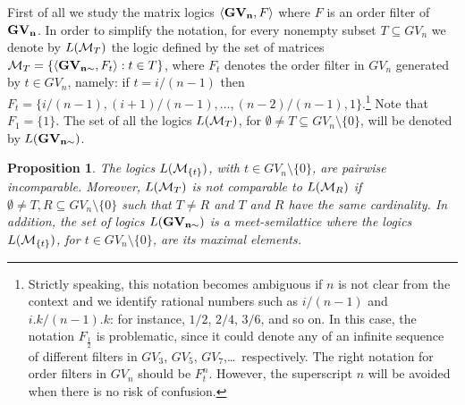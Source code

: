 \documentclass{article}
\newtheorem{proposition}{Proposition}
\theoremstyle{definition}
\begin{document}
First of all we study the matrix logics $\langle {\bf GV_n},F\rangle$ where $F$ is an order filter of $\bf GV_n$. 
In order to simplify the notation, for every nonempty subset $T \subseteq GV_n$ we denote by $L({\cal M}_T )$ the logic defined by the set of matrices ${\cal M}_T = \{\langle {\bf GV_{n\sim}},F_t \rangle : t \in T\}$, where $F_t$ denotes the order filter in $GV_n$ generated by $t \in GV_n$, namely: if $t=i/(n-1)$ then $F_t = \{i/(n-1), (i+1)/(n-1), \ldots, (n-2)/(n-1), 1\}$.\footnote{Strictly speaking, this notation becomes ambiguous if $n$ is not clear from the context and we  identify rational numbers such as $i/(n-1)$ and $i.k/(n-1).k$:  for instance, $1/2$, $2/4$, $3/6$, and so on. In this case, the notation $F_{\frac{1}{2}}$ is problematic, since it  could denote any of an infinite sequence of different filters in  $GV_3$, $GV_5$, $GV_7$,\ldots\ respectively. The right notation for order filters in $GV_n$ should be $F^n_t$. However, the superscript $n$ will be avoided when there is no risk of confusion.} Note that $F_1=\{1\}$. The set of all the logics $L({\cal M}_T )$, for $\emptyset \neq T \subseteq GV_n \setminus\{0\}$, will be denoted by $L({\bf GV_{n \sim}})$. 

 \begin{proposition} \label{propGVn}
The logics $L({\cal M}_{\{t\}})$, with $t \in GV_n \setminus\{0\}$, are pairwise incomparable. Moreover, $L({\cal M}_T )$  is not comparable to  $L({\cal M}_R )$ if $\emptyset\neq T, R \subseteq GV_n \setminus\{0\}$ such that $T\neq R$ and $T$ and $R$ have  the same cardinality.   In addition, the set of logics $L({\bf GV_{n \sim}})$ is a  meet-semilattice  where the logics $L({\cal M}_{\{t\}})$, for $t \in GV_n \setminus\{0\}$, are its maximal elements.
\end{proposition}
\end{document}
